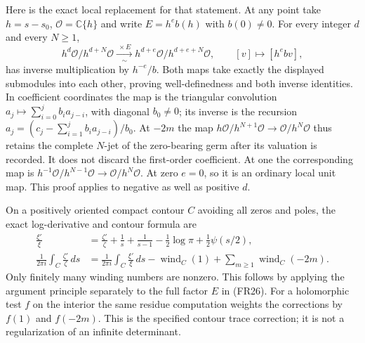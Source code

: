 \documentclass[11pt]{article}
\newcommand{\C}{\mathbb C}\newcommand{\R}{\mathbb R}
\begin{document}
Here is the exact local replacement for that statement. At any point take $h=s-s_0$, $\mathcal O=\C\{h\}$ and write $E=h^e b(h)$ with $b(0)\ne0$. For every integer $d$ and every $N\geq1$,
\begin{equation}
 h^d\mathcal O/h^{d+N}\mathcal O
 \xrightarrow[\ \sim\ ]{\ \times E\ }
 h^{d+e}\mathcal O/h^{d+e+N}\mathcal O,
 \qquad [v]\longmapsto[h^ebv],
 \tag{FR29}
\end{equation}
has inverse multiplication by $h^{-e}/b$. Both maps take exactly the displayed submodules into each other, proving well-definedness and both inverse identities. In coefficient coordinates the map is the triangular convolution
$a_j\mapsto\sum_{i=0}^jb_i a_{j-i}$, with diagonal $b_0\ne0$; its inverse is the recursion
$a_j=(c_j-\sum_{i=1}^jb_i a_{j-i})/b_0$.
At $-2m$ the map $h\mathcal O/h^{N+1}\mathcal O\to\mathcal O/h^N\mathcal O$ thus retains the complete $N$-jet of the zero-bearing germ after its valuation is recorded. It does not discard the first-order coefficient. At one the corresponding map is $h^{-1}\mathcal O/h^{N-1}\mathcal O\to\mathcal O/h^N\mathcal O$. At zero $e=0$, so it is an ordinary local unit map. This proof applies to negative as well as positive $d$.

On a positively oriented compact contour $C$ avoiding all zeros and poles, the exact log-derivative and contour formula are
\begin{align}
 \frac{\xi'}\xi&=\frac{\zeta'}\zeta+\frac1s+\frac1{s-1}
 -\frac12\log\pi+\frac12\psi(s/2),\tag{FR30}\\
 \frac1{2\pi i}\int_C\frac{\zeta'}\zeta\,ds
 &=\frac1{2\pi i}\int_C\frac{\xi'}\xi\,ds
 -\operatorname{wind}_C(1)+\sum_{m\geq1}\operatorname{wind}_C(-2m).
 \tag{FR31}
\end{align}
Only finitely many winding numbers are nonzero. This follows by applying the argument principle separately to the full factor $E$ in (FR26). For a holomorphic test $f$ on the interior the same residue computation weights the corrections by $f(1)$ and $f(-2m)$. This is the specified contour trace correction; it is not a regularization of an infinite determinant.
\end{document}
